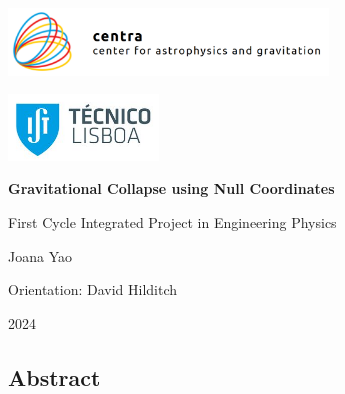 \documentclass[11pt]{article}
\begin{document}
\begin{titlepage}

    \begin{flushleft}
        \includegraphics[width=8.5cm]{Images/centra.png}
    \end{flushleft}

    \begin{flushright}
        \vspace{-2.2cm}
        \includegraphics[width=4cm]{Images/college_logo.jpg}
    \end{flushright}
    
    \vspace{7cm}
    
    \centering
    {\huge\textbf{Gravitational Collapse using Null Coordinates} \par}
    
    \vspace{5cm}
    
    {\large First Cycle Integrated Project in Engineering Physics\par}
    \vspace{3cm}
    {\large Joana Yao\par}
    \vspace{0.5cm}
    {\large Orientation: David Hilditch\par}
    
    \vfill
    
    {\large 2024\par}
\end{titlepage}

\noindent
\hrulefill%
\begin{center}
    \section*{Abstract}

\end{center}
\hrulefill%
\vspace{0.5cm}
\end{document}
